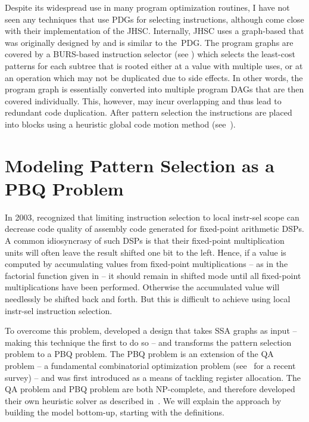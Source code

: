 Despite its widespread use in many \gls{program} optimization routines, I have
not seen any techniques that use \glspl{PDG} for selecting \glspl{instruction},
although \textcite{Paleczny2001} come close with their implementation of the
\gls{JHSC}.
%
Internally, \gls{JHSC} uses a \gls{graph}-based \tIRformat that was
originally designed by \textcite{Click1995a} and is similar to
the~\gls{PDG}.
%
The \glspl{program graph} are covered by a \gls{BURS}-based
\gls{instruction selector} (see )
which selects the least-cost \glspl{pattern} for each \gls{subtree} that is
rooted either at a value with multiple uses, or at an operation which may not be
duplicated due to \glspl{side effect}.
%
In other words, the \gls{program graph}
is essentially converted into multiple \glspl{program DAG} that are then covered
individually.
%
This, however, may incur overlapping and thus lead to redundant
code duplication.
%
After \gls{pattern selection} the \glspl{instruction} are
placed into \glspl{block} using a heuristic \gls{global code motion} method
(see~\cite{Click1995b}).


\section{Modeling Pattern Selection as a PBQ Problem}

In 2003, \textcite{Eckstein2003} recognized that limiting \gls{instruction
  selection} to \gls{local instr-sel} scope can decrease code quality of
\gls{assembly code} generated for fixed-point arithmetic \glsdesc{DSP}s.
%
A
common idiosyncrasy of such \glspl{DSP} is that their fixed-point multiplication
units will often leave the result shifted one bit to the left.
%
Hence, if a value
is computed by accumulating values from fixed-point multiplications -- as in the
factorial \gls{function} given in \unskip%
 -- it should remain in shifted mode until all fixed-point multiplications have
been performed.
%
Otherwise the accumulated value will needlessly be shifted back
and forth.
%
But this is difficult to achieve using \gls{local instr-sel}
\gls{instruction selection}.

To overcome this problem, \citeauthor{Eckstein2003} developed a design that
takes \glspl{SSA graph} as input -- making this technique the first to do
so -- and transforms the \gls{pattern selection} problem to a \gls{PBQ
  problem}.
%
The \gls{PBQ problem} is an extension of the \gls{QA problem} -- a
fundamental combinatorial optimization problem (see~\cite{Loiola2007} for a
recent survey) -- and was first introduced \textcite{Scholz2002} as a means of
tackling \gls{register allocation}.
%
The \gls{QA problem} and \gls{PBQ problem}
are both NP-complete, and \citeauthor{Eckstein2003} therefore developed
their own heuristic solver as described in~\cite{Eckstein2003}.
%
We will explain
the  approach by building the model bottom-up, starting
with the definitions.

